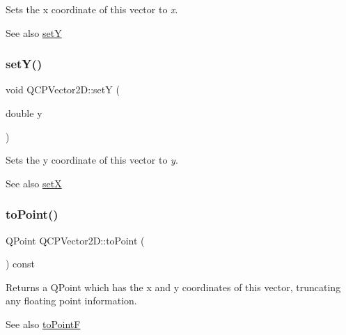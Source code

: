 Sets the x coordinate of this vector to {\itshape x}.

\begin{DoxySeeAlso}{See also}
\hyperlink{classQCPVector2D_ada288019aa8cd51e3b30acfc07b461dc}{setY} 
\end{DoxySeeAlso}
\mbox{\label{classQCPVector2D_ada288019aa8cd51e3b30acfc07b461dc}} 
\subsubsection{\texorpdfstring{set\+Y()}{setY()}}
{\footnotesize\ttfamily void Q\+C\+P\+Vector2\+D\+::setY (\begin{DoxyParamCaption}\item[{double}]{y }\end{DoxyParamCaption})\hspace{0.3cm}{\ttfamily [inline]}}

Sets the y coordinate of this vector to {\itshape y}.

\begin{DoxySeeAlso}{See also}
\hyperlink{classQCPVector2D_ab4249e6ce7bfc37be56f014c54b761ae}{setX} 
\end{DoxySeeAlso}
\mbox{\label{classQCPVector2D_add3edf75de9b7bf1abc693b973b2e906}} 
\subsubsection{\texorpdfstring{to\+Point()}{toPoint()}}
{\footnotesize\ttfamily Q\+Point Q\+C\+P\+Vector2\+D\+::to\+Point (\begin{DoxyParamCaption}{ }\end{DoxyParamCaption}) const\hspace{0.3cm}{\ttfamily [inline]}}

Returns a Q\+Point which has the x and y coordinates of this vector, truncating any floating point information.

\begin{DoxySeeAlso}{See also}
\hyperlink{classQCPVector2D_acd7af3f4a62833ada58be3f3021dbbac}{to\+PointF} 
\end{DoxySeeAlso}
\mbox{\label{classQCPVector2D_acd7af3f4a62833ada58be3f3021dbbac}} 
